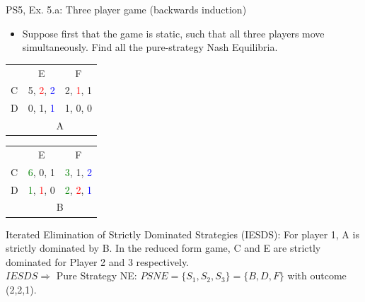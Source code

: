 \begin{frame}{PS5, Ex. 5.a: Three player game (backwards induction)}
    \begin{itemize}
      \item[(a)] Suppose first that the game is static, such that all three players move simultaneously. Find all the pure-strategy Nash Equilibria.
    \end{itemize}
    \begin{table}
      \begin{tabular}{l|c|c|}
        \multicolumn{1}{c}{} & \multicolumn{1}{c}{E} & \multicolumn{1}{c}{F} \\\cline{2-3}
        C & 5, \textcolor{red}{2}, \textcolor{blue}{2} & 2, \textcolor{red}{1}, 1 \\\cline{2-3}
        D & 0, 1, \textcolor{blue}{1} & 1, 0, 0 \\\cline{2-3}
        \multicolumn{1}{c}{} & \multicolumn{2}{c}{A}
      \end{tabular}\quad
      \begin{tabular}{l|c|c|}
        \multicolumn{1}{c}{} & \multicolumn{1}{c}{E} & \multicolumn{1}{c}{\color{blue}F} \\\cline{2-3}
        C & \textcolor{green}{6}, 0, 1 & \textcolor{green}{3}, 1, \textcolor{blue}{2} \\\cline{2-3}
        \color{red}D & \textcolor{green}{1}, \textcolor{red}{1}, 0 & \textcolor{green}{2}, \textcolor{red}{2}, \textcolor{blue}{1} \\\cline{2-3}
        \multicolumn{1}{c}{} & \multicolumn{2}{c}{\color{green}B}
      \end{tabular}
    \end{table}
    Iterated Elimination of Strictly Dominated Strategies (IESDS): For player 1, A is strictly dominated by B. In the reduced form game, C and E are strictly dominated for Player 2 and 3 respectively.\\\medskip
    $IESDS \Rightarrow$ Pure Strategy NE: $PSNE=\{S_1,S_2,S_3\}=\{B,D,F\}$ with outcome (2,2,1).
  \vfill\null
\end{frame}

